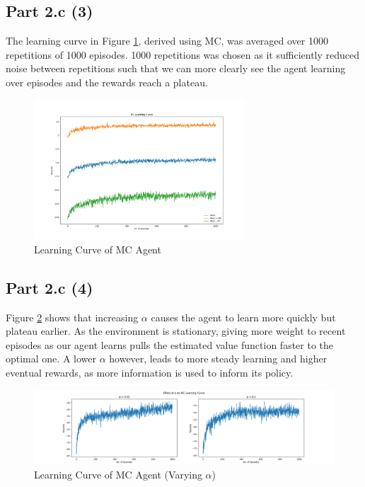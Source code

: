 \documentclass[12pt]{article}
\begin{document}
\subsection*{Part 2.c (3)}

The learning curve in Figure \ref{figure:2c3}, derived using MC, was averaged over 1000 repetitions of 1000 episodes. 1000 repetitions was chosen as it sufficiently reduced noise between repetitions such that we can more clearly see the agent learning over episodes and the rewards reach a plateau.

\begin{figure}[H]
    \centering
    \includegraphics[width=0.7\textwidth]{figures/2c3.png}
    \caption{Learning Curve of MC Agent}
    \label{figure:2c3}
\end{figure}

\subsection*{Part 2.c (4)}

Figure \ref{figure:2c4_alpha} shows that increasing \(\alpha\) causes the agent to learn more quickly but plateau earlier. As the environment is stationary, giving more weight to recent episodes as our agent learns pulls the estimated value function faster to the optimal one. A lower \(\alpha\) however, leads to more steady learning and higher eventual rewards, as more information is used to inform its policy.

\begin{figure}[H]
    \centering
    \includegraphics[width=\textwidth]{figures/2c4_alpha.png}
    \caption{Learning Curve of MC Agent (Varying \(\alpha\))}
    \label{figure:2c4_alpha}
\end{figure}
\end{document}
